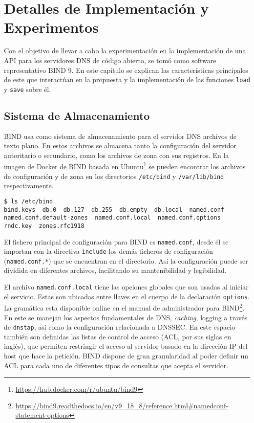 \chapter{Detalles de Implementación y Experimentos}\label{chapter:implementation}

Con el objetivo de llevar a cabo la experimentación en la implementación de una API para los servidores DNS de código abierto, se tomó como software representativo BIND 9. En este capítulo se explican las características principales de este que interactúan en la propuesta y la implementación de las funciones \verb|load| y \verb|save| sobre él.

\section{Sistema de Almacenamiento}
BIND usa como sistema de almacenamiento para el servidor DNS archivos de texto plano. En estos archivos se almacena tanto la configuración del servidor autoritario o secundario, como los archivos de zona con sus registros. En la imagen de Docker de BIND basada en Ubuntu\footnote{\url{https://hub.docker.com/r/ubuntu/bind9}} se pueden encontrar los archivos de configuración y de zona en los directorios \verb+/etc/bind+ y \verb+/var/lib/bind+ respectivamente.

\begin{lstlisting}[frame=single, numbers=none, caption=Contenido del directorio \textbf{/etc/bind}.]
$ ls /etc/bind
bind.keys  db.0  db.127  db.255  db.empty  db.local  named.conf
named.conf.default-zones  named.conf.local  named.conf.options
rndc.key  zones.rfc1918
\end{lstlisting}

El fichero principal de configuración para BIND es \verb+named.conf+, desde él se importan con la directiva \verb+include+ los demás ficheros de configuración (\verb+named.conf.*+) que se encuentran en el directorio. Así la configuración puede ser dividida en diferentes archivos, facilitando su mantenibilidad y legibilidad.

El archivo \verb+named.conf.local+ tiene las opciones globales que son usadas al iniciar el servicio. Estas son ubicadas entre llaves en el cuerpo de la declaración \verb+options+. La gramática esta disponible online en el manual de administrador para BIND\footnote{\url{https://bind9.readthedocs.io/en/v9_18_8/reference.html\#namedconf-statement-options}}. En este se manejan los aspectos fundamentales de DNS, \textit{caching}, logging a través de \verb+dnstap+, así como la configuración relacionada a DNSSEC. En este espacio también son definidas las listas de control de acceso (ACL, por sus siglas en inglés), que permiten restringir el acceso al servidor basado en la dirección IP del host que hace la petición. BIND dispone de gran granularidad al poder definir un ACL para cada uno de diferentes tipos de consultas que acepta el servidor.


